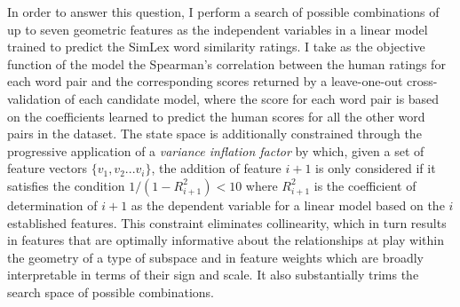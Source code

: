 In order to answer this question, I perform a search of possible combinations of up to seven geometric features as the independent variables in a linear model trained to predict the SimLex word similarity ratings.  I take as the objective function of the model the Spearman's correlation between the human ratings for each word pair and the corresponding scores returned by a leave-one-out cross-validation of each candidate model, where the score for each word pair is based on the coefficients learned to predict the human scores for all the other word pairs in the dataset.  The state space is additionally constrained through the progressive application of a \emph{variance inflation factor} \citep{OBrien2007} by which, given a set of feature vectors $\{v_1,v_2... v_i\}$, the addition of feature $i+1$ is only considered if it satisfies the condition $1/(1-R_{i+1}^{2}) < 10$ where $R_{i+1}^2$ is the coefficient of determination of $i+1$ as the dependent variable for a linear model based on the $i$ established features.  This constraint eliminates collinearity, which in turn results in features that are optimally informative about the relationships at play within the geometry of a type of subspace and in feature weights which are broadly interpretable in terms of their sign and scale.  It also substantially trims the search space of possible combinations.


